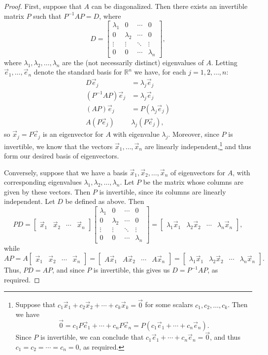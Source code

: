 \documentclass[12pt,letterpaper]{article}
\newcommand{\R}{\mathbb{R}}
\newcommand{\bbm}{\begin{bmatrix}}
\newcommand{\ebm}{\end{bmatrix}}
\begin{document}
\begin{proof}
 First, suppose that $A$ can be diagonalized. Then there exists an invertible matrix $P$ such that $P^{-1}AP = D$, where
\[
 D = \bbm \lambda_1 & 0 & \cdots & 0\\0&\lambda_2 & \cdots & 0\\\vdots & \vdots & \ddots &\vdots\\0&0&\cdots & \lambda_n\ebm,
\]
where $\lambda_1, \lambda_2, \ldots, \lambda_n$ are the (not necessarily distinct) eigenvalues of $A$. Letting $\vec{e}_1,\ldots, \vec{e}_n$ denote the standard basis for $\R^n$ we have, for each $j=1,2,\ldots, n$:
\begin{align*}
 D\vec{e}_j & = \lambda_j \vec{e}_j\\
 (P^{-1}AP)\vec{e}_j & = \lambda_j\vec{e}_j\\
 (AP)\vec{e}_j & = P(\lambda_j\vec{e}_j)\\
 A(P\vec{e}_j) & \lambda_j(P\vec{e}_j),
\end{align*}
so $\vec{x}_j = P\vec{e}_j$ is an eigenvector for $A$ with eigenvalue $\lambda_j$. Moreover, since $P$ is invertible, we know that the vectors $\vec{x}_1, \ldots, \vec{x}_n$ are linearly independent,\footnote{Suppose that $c_1\vec{x}_1+c_2\vec{x}_2+\cdots +c_k\vec{x}_k=\vec{0}$ for some scalars $c_1,c_2,\ldots, c_k$. Then we have
\[
 \vec{0} = c_1P\vec{e}_1+\cdots +c_nP\vec{e}_n = P(c_1\vec{e}_1+\cdots +c_n\vec{e}_n).
\]
Since $P$ is invertible, we can conclude that $c_1\vec{e}_1+\cdots + c_n\vec{e}_n = \vec{0}$, and thus $c_1=c_2=\cdots=c_n=0$, as required.}
 and thus form our desired basis of eigenvectors.


Conversely, suppose that we have a basis $\vec{x}_1, \vec{x}_2, \ldots, \vec{x}_n$ of eigenvectors for $A$, with corresponding eigenvalues $\lambda_1,\lambda_2, \ldots, \lambda_n$. Let $P$ be the matrix whose columns are given by these vectors. Then $P$ is invertible, since its columns are linearly independent. Let $D$ be defined as above. Then
\[
 PD = \bbm \vec{x}_1 & \vec{x}_2 &\cdots & \vec{x}_n\ebm \bbm \lambda_1 & 0 & \cdots & 0\\0&\lambda_2 & \cdots & 0\\\vdots & \vdots & \ddots &\vdots\\0&0&\cdots & \lambda_n\ebm = \bbm \lambda_1\vec{x}_1 & \lambda_2\vec{x}_2 & \cdots & \lambda_n\vec{x}_n\ebm,
\]
while
\[
 AP = A\bbm \vec{x}_1 & \vec{x}_2 & \cdots &\vec{x}_n\ebm = \bbm A\vec{x}_1 & A\vec{x}_2 & \cdots & A\vec{x}_n\ebm = \bbm \lambda_1\vec{x}_1&\lambda_2\vec{x}_2&\cdots & \lambda_n\vec{x}_n\ebm.
\]
Thus, $PD=AP$, and since $P$ is invertible, this gives us $D=P^{-1}AP$, as required.
\end{proof}
\end{document}
